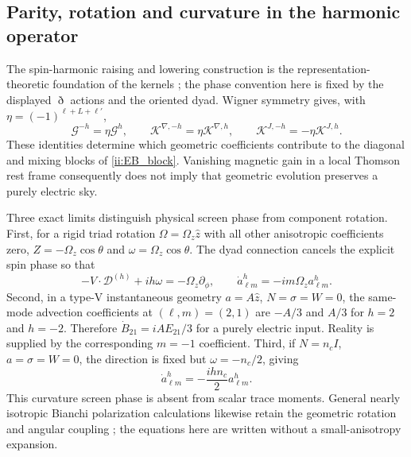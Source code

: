 \subsection{Parity, rotation and curvature in the harmonic operator}
The spin-harmonic raising and lowering construction is the representation-theoretic foundation of the kernels \cite{Goldberg1967}; the phase convention here is fixed by the displayed $\eth$ actions and the oriented dyad. Wigner symmetry gives, with $\eta=(-1)^{\ell+L+\ell'}$,
\begin{equation}
 \mathcal G^{-h}=\eta\mathcal G^h,\qquad
 \mathcal K^{\nabla,-h}=\eta\mathcal K^{\nabla,h},\qquad
 \mathcal K^{J,-h}=-\eta\mathcal K^{J,h}.
 \label{ii:kernel_parity}
\end{equation}
These identities determine which geometric coefficients contribute to the diagonal and mixing blocks of \eqref{ii:EB_block}. Vanishing magnetic gain in a local Thomson rest frame consequently does not imply that geometric evolution preserves a purely electric sky.

Three exact limits distinguish physical screen phase from component rotation. First, for a rigid triad rotation $\Omega=\Omega_z\hat z$ with all other anisotropic coefficients zero,
$Z=-\Omega_z\cos\theta$ and $\omega=\Omega_z\cos\theta$.
The dyad connection cancels the explicit spin phase so that
\begin{equation}
 -V\cdot\mathscr D^{(h)}+ih\omega=-\Omega_z\partial_\phi,
 \qquad \dot a^h_{\ell m}=-im\Omega_z a^h_{\ell m}.
 \label{ii:rigid_rotation_limit}
\end{equation}
Second, in a type-V instantaneous geometry $a=A\hat z$, $N=\sigma=W=0$, the same-mode advection coefficients at $(\ell,m)=(2,1)$ are $-A/3$ and $A/3$ for $h=2$ and $h=-2$. Therefore $\dot B_{21}=iAE_{21}/3$ for a purely electric input. Reality is supplied by the corresponding $m=-1$ coefficient. Third, if $N=n_cI$, $a=\sigma=W=0$, the direction is fixed but $\omega=-n_c/2$, giving
\begin{equation}
 \dot a^h_{\ell m}=-\frac{ihn_c}{2}a^h_{\ell m}.
 \label{ii:isotropic_curvature_phase}
\end{equation}
This curvature screen phase is absent from scalar trace moments. General nearly isotropic Bianchi polarization calculations likewise retain the geometric rotation and angular coupling \cite{PontzenChallinor2007}; the equations here are written without a small-anisotropy expansion.

